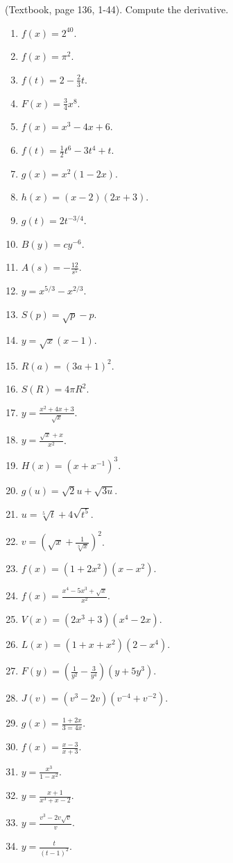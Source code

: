 \begin{problem} (Textbook, page 136, 1-44).
Compute the derivative.
\begin{multicols}{3}
\begin{enumerate}
\item $f(x)=2^{40}$.
\item $f(x)=\pi^2$.
\item $f(t)=2-\frac{2}{3}t$.
\item $F(x)=\frac{3}{4}x^8$.
\item $f(x)=x^3-4x+6$.
\item $f(t)=\frac{1}{2}t^6-3t^4+t$.
\item $g(x)=x^2(1-2x)$. 
\item $h(x)=(x-2)(2x+3)$.
\item $g(t)=2t^{-3/4}$.
\item $B(y)=c y^{-6}$.
\item $A(s)=-\frac{12}{s^5}$.
\item $y=x^{5/3}-x^{2/3}$.
\item $S(p)=\sqrt{p}-p$.
\item $y=\sqrt{x}(x-1)$.
\item $R(a)=(3a+1)^2$.
\item $S(R)=4\pi R^2$.
\item $y=\frac{ x^2+4x+3}{\sqrt{x}}$.
\item $y=\frac{\sqrt{x}+x}{x^2}$.
\item $H(x)=(x+x^{-1})^3$.
\item $g(u)=\sqrt 2 u +\sqrt{3u}$.
\item $u=\sqrt[5]t+4\sqrt{t^5}$.
\item $v=\left(\sqrt{x}+\frac{1}{\sqrt[3]{x}}\right)^2$.
\item $f(x)=(1+2x^2)(x-x^2)$.
\item $f(x)=\frac{x^4-5x^3+\sqrt{x}}{x^2}$.
\item $V(x)=(2x^3+3)(x^4-2x)$.
\item $L(x)=(1+x+x^2)(2-x^4)$.
\item $F(y)=\left(\frac{1}{y^2}-\frac{3}{y^4} \right)(y+5y^3)$.
\item $J(v)=(v^3-2v)(v^{-4}+v^{-2})$.
\item $g(x)=\frac{1+2x}{3=4x}$.
\item $f(x)=\frac{x-3}{x+3}$.
\item $y=\frac{x^3}{1-x^2}$.
\item $y=\frac{x+1}{x^3+x-2}$.
\item $y=\frac{v^3-2v\sqrt{v}}{v}$.
\item $y=\frac{t}{(t-1)^2}$.

\end{enumerate}
\end{multicols}
\end{problem}
